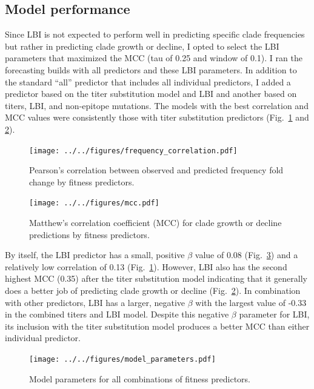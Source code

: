 \documentclass[12pt]{article}
\begin{document}
\subsection{Model performance}

Since LBI is not expected to perform well in predicting specific clade frequencies but rather in predicting clade growth or decline, I opted to select the LBI parameters that maximized the MCC (tau of 0.25 and window of 0.1).
I ran the forecasting builds with all predictors and these LBI parameters.
In addition to the standard ``all'' predictor that includes all individual predictors, I added a predictor based on the titer substitution model and LBI and another based on titers, LBI, and non-epitope mutations.
The models with the best correlation and MCC values were consistently those with titer substitution predictors (Fig.~\ref{fig:model-frequency-correlations} and \ref{fig:model-mcc}).

\begin{figure}
\texttt{[image: ../../figures/frequency\_correlation.pdf]}
\caption{\label{fig:model-frequency-correlations}Pearson's correlation between observed and predicted frequency fold change by fitness predictors.}
\end{figure}

\begin{figure}
\texttt{[image: ../../figures/mcc.pdf]}
\caption{\label{fig:model-mcc}Matthew's correlation coefficient (MCC) for clade growth or decline predictions by fitness predictors.}
\end{figure}

By itself, the LBI predictor has a small, positive $\beta$ value of 0.08 (Fig.~\ref{fig:model-parameters}) and a relatively low correlation of 0.13 (Fig.~\ref{fig:model-frequency-correlations}).
However, LBI also has the second highest MCC (0.35) after the titer substitution model indicating that it generally does a better job of predicting clade growth or decline (Fig.~\ref{fig:model-mcc}).
In combination with other predictors, LBI has a larger, negative $\beta$ with the largest value of -0.33 in the combined titers and LBI model.
Despite this negative $\beta$ parameter for LBI, its inclusion with the titer substitution model produces a better MCC than either individual predictor.

\begin{figure}
\texttt{[image: ../../figures/model\_parameters.pdf]}
\caption{\label{fig:model-parameters}Model parameters for all combinations of fitness predictors.}
\end{figure}
\end{document}
